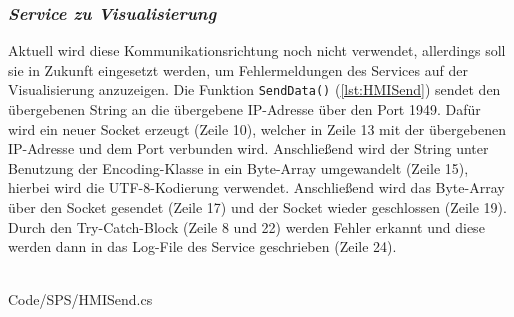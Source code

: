 \subsubsection{\textit{Service zu Visualisierung}}
Aktuell wird diese Kommunikationsrichtung noch nicht verwendet, allerdings soll sie in Zukunft eingesetzt werden, um Fehlermeldungen des Services auf der Visualisierung anzuzeigen. Die Funktion \texttt{SendData()} (\autoref{lst:HMISend}) sendet den übergebenen String an die übergebene IP-Adresse über den Port 1949. Dafür wird ein neuer Socket erzeugt (Zeile 10), welcher in Zeile 13 mit der übergebenen IP-Adresse und dem Port verbunden wird. Anschließend wird der String unter Benutzung der Encoding-Klasse in ein Byte-Array umgewandelt (Zeile 15), hierbei wird die UTF-8-Kodierung verwendet. Anschließend wird das Byte-Array über den Socket gesendet (Zeile 17) und der Socket wieder geschlossen (Zeile 19). Durch den Try-Catch-Block (Zeile 8 und 22) werden Fehler erkannt und diese werden dann in das Log-File des Service geschrieben (Zeile 24).
\ \\
\begin{minipage}{\textwidth}
\ \\
 {Code/SPS/HMISend.cs}
\ \\
\end{minipage}
\ \\
